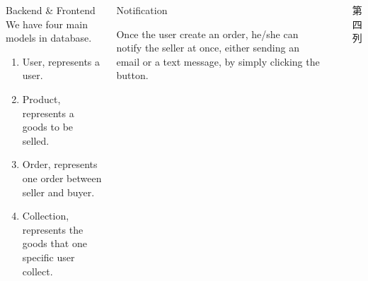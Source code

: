 \documentclass[final]{beamer}
\newlength{\sepwid}
\newlength{\onecolwid}
\begin{document}
\begin{frame}[t]
\begin{columns}[t]
\begin{column}{\onecolwid}
\begin{block}{Backend \& Frontend}
        We have four main models in database.
        \begin{enumerate}
        \item User, represents a user.
        \item Product, represents a goods to be selled.
        \item Order, represents one order between seller and buyer.
        \item Collection, represents the goods that one specific user collect.
        \end{enumerate}
        \end{block}




    \end{column} %

    \begin{column}{\onecolwid}\vspace{-.6in} %
    
        \begin{block}{Notification}

        Once the user create an order, he/she can notify the seller at once, either sending an email
        or a text message, by simply clicking the button.
        \end{block}



    \end{column} %
    \begin{column}{\sepwid}\end{column} %
        
    \begin{column}{\onecolwid}
    第四列
    \end{column}
\end{columns} %





\end{frame}
\end{document}
